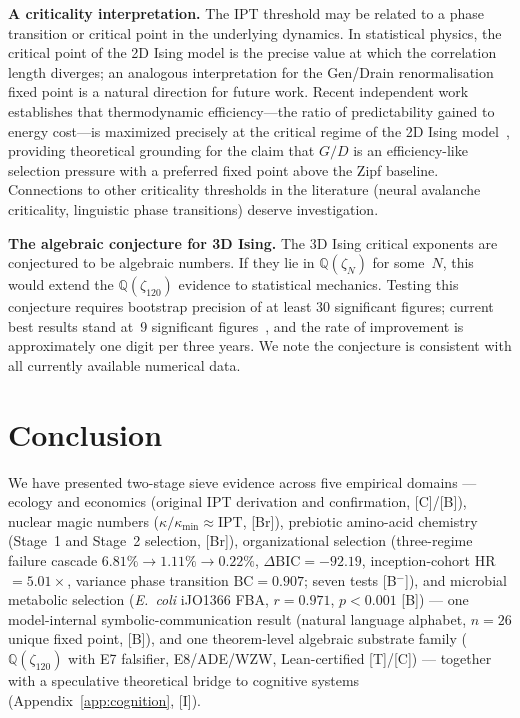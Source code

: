 \documentclass[11pt]{article}
\theoremstyle{remark}
\newcommand{\IPT}{\mathrm{IPT}}
\newcommand{\zetaN}[1]{\zeta_{#1}}
\begin{document}
\textbf{A criticality interpretation.}
The IPT threshold may be related to a phase transition or critical point in the
underlying dynamics.
In statistical physics, the critical point of the 2D Ising model is the precise
value at which the correlation length diverges; an analogous interpretation for
the Gen/Drain renormalisation fixed point is a natural direction for future work.
Recent independent work establishes that thermodynamic efficiency---the ratio of
predictability gained to energy cost---is maximized precisely at the critical regime
of the 2D Ising model~\cite{ChenProkopenko2024}, providing theoretical grounding
for the claim that $G/D$ is an efficiency-like selection pressure with a preferred
fixed point above the Zipf baseline.
Connections to other criticality thresholds in the literature (neural avalanche
criticality, linguistic phase transitions) deserve investigation.

\textbf{The algebraic conjecture for 3D Ising.}
The 3D Ising critical exponents are conjectured to be algebraic numbers.
If they lie in $\mathbb{Q}(\zetaN{N})$ for some~$N$, this would extend the
$\mathbb{Q}(\zetaN{120})$ evidence to statistical mechanics.
Testing this conjecture requires bootstrap precision of at least 30 significant
figures; current best results stand at~9 significant figures~\cite{BootstrapStressTensor2025},
and the rate of improvement is approximately one digit per three years.
We note the conjecture is consistent with all currently available numerical data.

\section{Conclusion}

We have presented two-stage sieve evidence across five empirical domains ---
ecology and economics (original IPT derivation and confirmation, [C]/[B]),
nuclear magic numbers ($\kappa/\kappa_\mathrm{min} \approx \IPT$, [Br]),
prebiotic amino-acid chemistry (Stage~1 and Stage~2 selection, [Br]),
organizational selection (three-regime failure cascade $6.81\%\to 1.11\%\to 0.22\%$,
$\Delta\mathrm{BIC}=-92.19$, inception-cohort HR~$=5.01\times$,
variance phase transition $\mathrm{BC}=0.907$; seven tests [B$^-$]),
and microbial metabolic selection (\emph{E.~coli} iJO1366 FBA, $r = 0.971$, $p < 0.001$ [B]) ---
one model-internal symbolic-communication result (natural language alphabet, $n=26$ unique fixed point, [B]),
and one theorem-level algebraic substrate family ($\mathbb{Q}(\zetaN{120})$ with E7 falsifier, E8/ADE/WZW, Lean-certified [T]/[C]) ---
together with a speculative theoretical bridge to cognitive systems (Appendix~\ref{app:cognition}, [I]).
\end{document}
